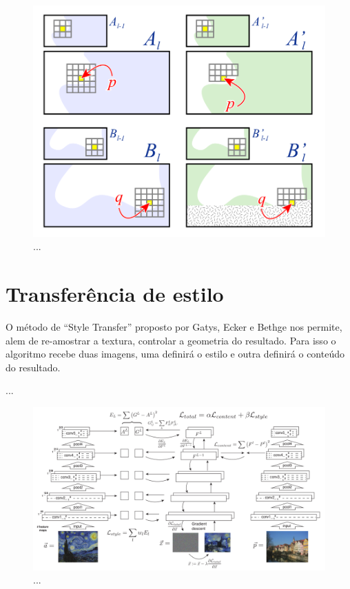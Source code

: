 \begin{figure}[!ht]
	\centering
	\includegraphics[width=\linewidth*2/3]{files/assets/articles/heartzmann2.png}
	\caption{...}
	\label{img:preview}
\end{figure}


\section{Transferência de estilo} 

O método de ``Style Transfer'' proposto
por Gatys, Ecker e Bethge \cite{Gatys2016}
nos permite, alem de re-amostrar a textura,
controlar a geometria do resultado.
Para isso o algoritmo recebe duas imagens,
uma definirá o estilo
e outra definirá o conteúdo do resultado.

...

\begin{figure}[!ht]
	\centering
	\includegraphics[width=\linewidth]{files/assets/articles/gatys3.png}
	\caption{...}
	\label{img:preview}
\end{figure}




\fi